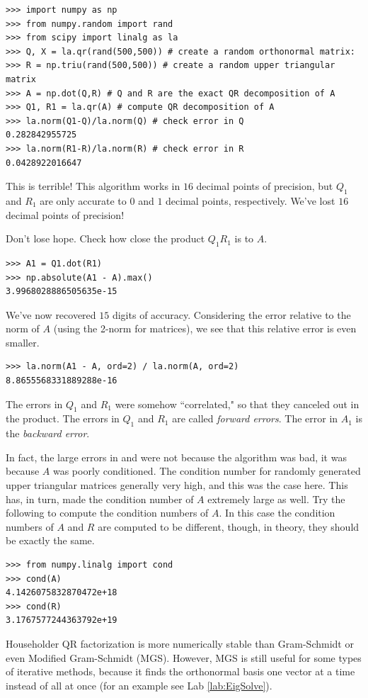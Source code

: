 \begin{lstlisting}
>>> import numpy as np
>>> from numpy.random import rand
>>> from scipy import linalg as la
>>> Q, X = la.qr(rand(500,500)) # create a random orthonormal matrix:
>>> R = np.triu(rand(500,500)) # create a random upper triangular matrix
>>> A = np.dot(Q,R) # Q and R are the exact QR decomposition of A
>>> Q1, R1 = la.qr(A) # compute QR decomposition of A
>>> la.norm(Q1-Q)/la.norm(Q) # check error in Q
0.282842955725
>>> la.norm(R1-R)/la.norm(R) # check error in R
0.0428922016647
\end{lstlisting}
This is terrible!
This algorithm works in $16$ decimal points of precision, but $Q_1$ and $R_1$ are only accurate to $0$ and $1$ decimal points, respectively.
We've lost $16$ decimal points of precision!

Don't lose hope.
Check how close the product $Q_1 R_1$ is to $A$.
\begin{lstlisting}
>>> A1 = Q1.dot(R1)
>>> np.absolute(A1 - A).max()
3.9968028886505635e-15
\end{lstlisting}
We've now recovered $15$ digits of accuracy.
Considering the error relative to the norm of $A$ (using the 2-norm for matrices), we see that this relative error is even smaller.
\begin{lstlisting}
>>> la.norm(A1 - A, ord=2) / la.norm(A, ord=2)
8.8655568331889288e-16
\end{lstlisting}
The errors in $Q_1$ and $R_1$ were somehow ``correlated," so that they canceled out in the product.
The errors in $Q_1$ and $R_1$ are called \emph{forward errors}.
The error in $A_1$ is the \emph{backward error}.

In fact, the large errors in  and  were not because the algorithm was bad, it was because $A$ was poorly conditioned.
The condition number for randomly generated upper triangular matrices generally very high, and this was the case here.
This has, in turn, made the condition number of $A$ extremely large as well.
Try the following to compute the condition numbers of $A$.
In this case the condition numbers of $A$ and $R$ are computed to be different, though, in theory, they should be exactly the same.
\begin{lstlisting}
>>> from numpy.linalg import cond
>>> cond(A)
4.1426075832870472e+18
>>> cond(R)
3.1767577244363792e+19
\end{lstlisting}

Householder QR factorization is more numerically stable than Gram-Schmidt or even Modified Gram-Schmidt (MGS).
However, MGS is still useful for some types of iterative methods, because it finds the orthonormal basis one vector at a time instead of all at once (for an example see Lab \ref{lab:EigSolve}).

